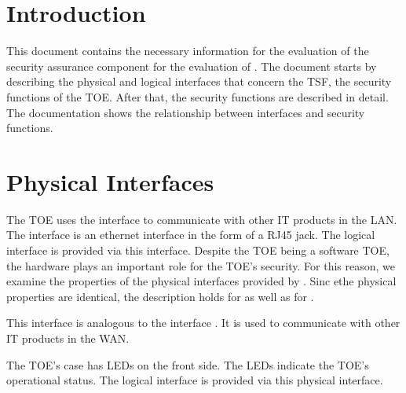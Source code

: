 \chapter{Introduction}
\label{intro}

This document contains the necessary information for the evaluation of the
security assurance component  for the evaluation of
\thisproduct{}. The document starts by describing the physical and logical
interfaces that concern the TSF, the security functions of the TOE. After that,
the security functions are described in detail. The documentation shows the
relationship between interfaces and security functions.




\cleardoublepage

\chapter{Physical Interfaces}\label{tsfi.ps}


The TOE uses the interface  to communicate with other IT
products in the LAN. The interface is an ethernet interface in the form of a
RJ45 jack. The logical interface \lslan{} is provided via this
interface. Despite the TOE being a software TOE, the hardware plays an important
role for the TOE's security. For this reason, we examine the properties of the
physical interfaces provided by \thisproduct{}. Sinc ethe physical properties
are identical, the description holds for  as well as for
.



This interface is analogous to the interface . It is used to
communicate with other IT products in the WAN.


The TOE's case has LEDs on the front side. The LEDs indicate the TOE's
operational status. The logical interface \lsled{} is provided via this physical
interface.

